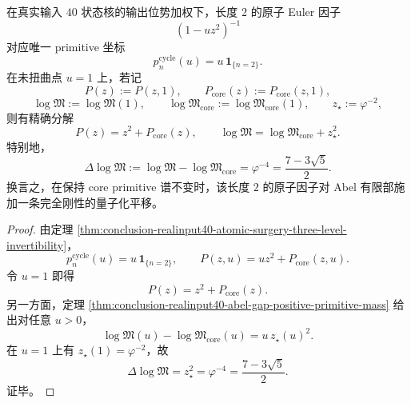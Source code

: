 \begin{proposition}\label{prop:conclusion-atomic-witt-factor-quantized-abel-shift}
在真实输入 \(40\) 状态核的输出位势加权下，长度 \(2\) 的原子 Euler 因子
\[
(1-uz^2)^{-1}
\]
对应唯一 primitive 坐标
\[
p_n^{\mathrm{cycle}}(u)=u\,\mathbf 1_{\{n=2\}}.
\]
在未扭曲点 \(u=1\) 上，若记
\[
P(z):=P(z,1),\qquad
P_{\mathrm{core}}(z):=P_{\mathrm{core}}(z,1),
\]
\[
\log\mathfrak M:=\log\mathfrak M(1),\qquad
\log\mathfrak M_{\mathrm{core}}:=\log\mathfrak M_{\mathrm{core}}(1),
\qquad
z_\star:=\varphi^{-2},
\]
则有精确分解
\[
P(z)=z^2+P_{\mathrm{core}}(z),
\qquad
\log\mathfrak M=\log\mathfrak M_{\mathrm{core}}+z_\star^2.
\]
特别地，
\[
\Delta\log\mathfrak M:=\log\mathfrak M-\log\mathfrak M_{\mathrm{core}}
=
\varphi^{-4}
=
\frac{7-3\sqrt5}{2}.
\]
换言之，在保持 core primitive 谱不变时，该长度 \(2\) 的原子因子对 Abel 有限部施加一条完全刚性的量子化平移。
\end{proposition}
\begin{proof}
由定理 \ref{thm:conclusion-realinput40-atomic-surgery-three-level-invertibility}，
\[
p_n^{\mathrm{cycle}}(u)=u\,\mathbf 1_{\{n=2\}},
\qquad
P(z,u)=uz^2+P_{\mathrm{core}}(z,u).
\]
令 \(u=1\) 即得
\[
P(z)=z^2+P_{\mathrm{core}}(z).
\]
另一方面，定理 \ref{thm:conclusion-realinput40-abel-gap-positive-primitive-mass} 给出对任意 \(u>0\)，
\[
\log\mathfrak M(u)-\log\mathfrak M_{\mathrm{core}}(u)=u\,z_\star(u)^2.
\]
在 \(u=1\) 上有 \(z_\star(1)=\varphi^{-2}\)，故
\[
\Delta\log\mathfrak M
=
z_\star^2
=
\varphi^{-4}
=
\frac{7-3\sqrt5}{2}.
\]
证毕。
\end{proof}

